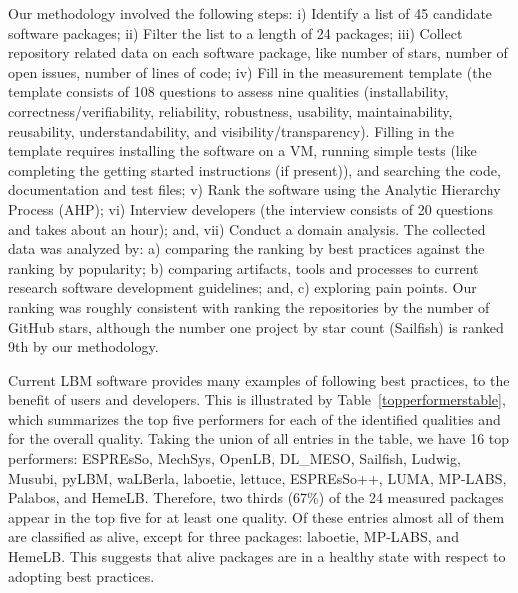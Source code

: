 \documentclass[final, 3p, times, authoryear]{elsarticle}
\begin{document}
Our methodology involved the following steps: i) Identify a list of 45 candidate
software packages; ii) Filter the list to a length of 24 packages; iii) Collect
repository related data on each software package, like number of stars, number
of open issues, number of lines of code; iv) Fill in the measurement template
(the template consists of 108 questions to assess nine qualities
(installability, correctness/verifiability, reliability, robustness, usability,
maintainability, reusability, understandability, and visibility/transparency).
Filling in the template requires installing the software on a VM, running simple
tests (like completing the getting started instructions (if present)), and
searching the code, documentation and test files; v) Rank the software using the
Analytic Hierarchy Process (AHP); vi) Interview developers (the interview
consists of 20 questions and takes about an hour); and, vii) Conduct a domain
analysis. The collected data was analyzed by: a) comparing the ranking by best
practices against the ranking by popularity; b) comparing artifacts, tools and
processes to current research software development guidelines; and, c) exploring
pain points.  Our ranking was roughly consistent with ranking the repositories
by the number of GitHub stars, although the number one project by star count
(Sailfish) is ranked 9th by our methodology.

Current LBM software provides many examples of following best practices, to the
benefit of users and developers.  This is illustrated by
Table~\ref{topperformerstable}, which summarizes the top five performers for
each of the identified qualities and for the overall quality. Taking the union
of all entries in the table, we have 16 top performers: ESPREsSo, MechSys,
OpenLB, DL\_MESO, Sailfish, Ludwig, Musubi, pyLBM, waLBerla, laboetie, lettuce,
ESPREsSo++, LUMA, MP-LABS, Palabos, and HemeLB.  Therefore, two thirds (67\%) of
the 24 measured packages appear in the top five for at least one quality.  Of
these entries almost all of them are classified as alive, except for three
packages: laboetie, MP-LABS, and HemeLB.  This suggests that alive packages are
in a healthy state with respect to adopting best practices.
\end{document}

